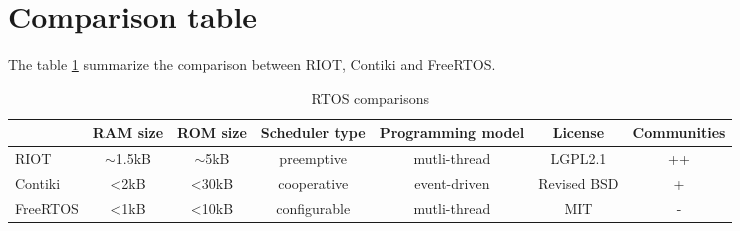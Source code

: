 \section{Comparison table}

The table \ref{tab:rtos-comparison} summarize the comparison between RIOT, Contiki and FreeRTOS.

\begin{table}[!ht]
  \centering
  \small
  \setlength\tabcolsep{1pt}
  \begin{tabular}{l|c|c|c|c|c|c}
           & RAM size       & ROM size        & Scheduler type & Programming model &  License     & Communities \\ \hline
  RIOT     & $\sim$1.5kB    & $\sim$5kB       & preemptive     & mutli-thread      &  LGPL2.1     & ++          \\
  Contiki  & \textless{}2kB & \textless{}30kB & cooperative    & event-driven      & Revised BSD & +           \\
  FreeRTOS & \textless{}1kB & \textless{}10kB & configurable   & mutli-thread      & MIT         & -          
  \end{tabular}
  \caption{RTOS comparisons}
  \label{tab:rtos-comparison}
  \end{table}